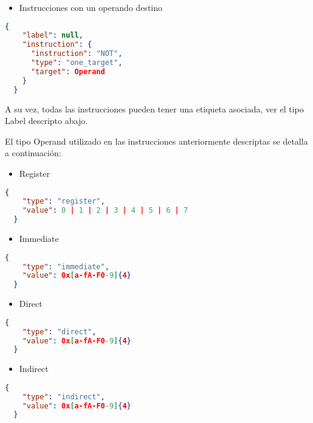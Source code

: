 \begin{itemize}
  \item Instrucciones con un operando destino
\end{itemize}
\begin{minipage}{\textwidth} 
  \begin{lstlisting}[language=json,firstnumber=0]
  {
    "label": null,
    "instruction": {
      "instruction": "NOT",
      "type": "one_target",
      "target": Operand
    }
  }
  \end{lstlisting}
\end{minipage}

A su vez, todas las instrucciones pueden tener una etiqueta asociada, ver el tipo Label descripto abajo.

El tipo Operand utilizado en las instrucciones anteriormente descriptas se detalla a continuación:
\begin{itemize}
  \item Register
\end{itemize}
\begin{minipage}{\textwidth} 
  \begin{lstlisting}[language=json,firstnumber=0]
  {
    "type": "register",
    "value": 0 | 1 | 2 | 3 | 4 | 5 | 6 | 7
  }
  \end{lstlisting}
\end{minipage}

\begin{itemize}
  \item Immediate
\end{itemize}
\begin{minipage}{\textwidth} 
  \begin{lstlisting}[language=json,firstnumber=0]
  {
    "type": "immediate",
    "value": 0x[a-fA-F0-9]{4}
  }
  \end{lstlisting}
\end{minipage}

\begin{itemize}
  \item Direct
\end{itemize}
\begin{minipage}{\textwidth} 
  \begin{lstlisting}[language=json,firstnumber=0]
  {
    "type": "direct",
    "value": 0x[a-fA-F0-9]{4}
  }
  \end{lstlisting}
\end{minipage}

\begin{itemize}
  \item Indirect
\end{itemize}
\begin{minipage}{\textwidth} 
  \begin{lstlisting}[language=json,firstnumber=0]
  {
    "type": "indirect",
    "value": 0x[a-fA-F0-9]{4}
  }
  \end{lstlisting}
\end{minipage}

